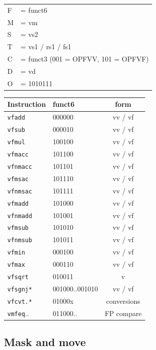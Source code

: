 \vspace{1.4ex}
\begin{center}
\begin{tabular}{@{}ll@{}}
F & = funct6 \\
M & = vm \\
S & = vs2 \\
T & = vs1 / rs1 / fs1 \\
C & = funct3 (001 = OPFVV, 101 = OPFVF) \\
D & = vd \\
O & = 1010111 \\
\end{tabular}
\end{center}

\begin{center}
\begin{tabular}{@{}llc@{}}
\toprule
Instruction & funct6 & form \\
\midrule
\texttt{vfadd}   & 000000 & vv / vf \\
\texttt{vfsub}   & 000010 & vv / vf \\
\texttt{vfmul}   & 100100 & vv / vf \\
\texttt{vfmacc}  & 101100 & vv / vf \\
\texttt{vfnmacc} & 101101 & vv / vf \\
\texttt{vfmsac}  & 101110 & vv / vf \\
\texttt{vfnmsac} & 101111 & vv / vf \\
\texttt{vfmadd}  & 101000 & vv / vf \\
\texttt{vfnmadd} & 101001 & vv / vf \\
\texttt{vfmsub}  & 101010 & vv / vf \\
\texttt{vfnmsub} & 101011 & vv / vf \\
\texttt{vfmin}   & 000100 & vv / vf \\
\texttt{vfmax}   & 000110 & vv / vf \\
\texttt{vfsqrt}   & 010011 & v \\
\texttt{vfsgnj*} & 001000..001010 & vv / vf \\
\texttt{vfcvt.*} & 01000x & conversions \\
\texttt{vmfeq}.. & 011000.. & FP compare \\
\bottomrule
\end{tabular}
\end{center}

\subsection{Mask and move}

